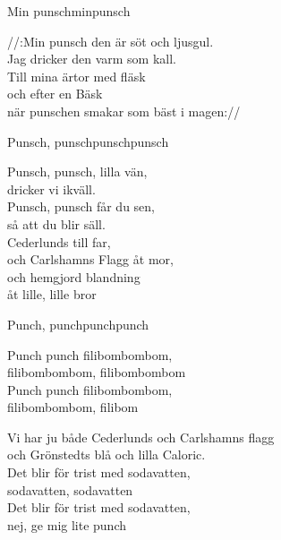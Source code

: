\begin{song}{Min punsch}{minpunsch}
\begin{vers}
//:Min punsch den är söt och ljusgul.\\
Jag dricker den varm som kall.\\
Till mina ärtor med fläsk\\
och efter en Bäsk\\
när punschen smakar som bäst i magen://\\
\end{vers}
\end{song}

\newpage

\begin{song}{Punsch, punsch}{punschpunsch}
\begin{vers}
Punsch, punsch, lilla vän,\\
dricker vi ikväll.\\
Punsch, punsch får du sen,\\
så att du blir säll.\\
Cederlunds till far,\\
och Carlshamns Flagg åt mor,\\
och hemgjord blandning\\
åt lille, lille bror\\
\end{vers}
\end{song}

\begin{song}{Punch, punch}{punchpunch}
\begin{vers}
Punch punch filibombombom,\\
filibombombom, filibombombom\\
Punch punch filibombombom,\\
filibombombom, filibom\\
\end{vers}
\begin{vers}
Vi har ju både Cederlunds och Carlshamns flagg\\
och Grönstedts blå och lilla Caloric.\\
Det blir för trist med sodavatten,\\
sodavatten, sodavatten\\
Det blir för trist med sodavatten,\\
nej, ge mig lite punch\\
\end{vers}
\end{song}

